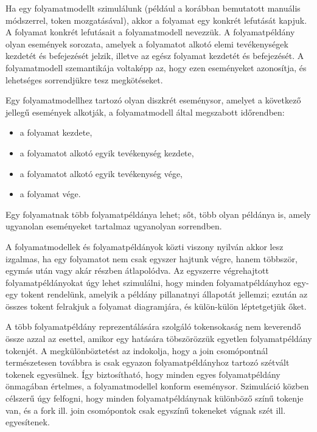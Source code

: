 
Ha egy folyamatmodellt szimulálunk (például a korábban bemutatott manuális módszerrel, token mozgatásával), akkor a folyamat egy konkrét lefutását kapjuk. A folyamat konkrét lefutásait a folyamatmodell  nevezzük. A folyamatpéldány olyan események sorozata, amelyek a folyamatot alkotó elemi tevékenységek kezdetét és befejezését jelzik, illetve az egész folyamat kezdetét és befejezését. A folyamatmodell szemantikája voltaképp az, hogy ezen eseményeket azonosítja, és lehetséges sorrendjükre tesz megkötéseket.

\begin{definicio}
	Egy folyamatmodellhez tartozó  olyan diszkrét eseménysor, amelyet a következő jellegű események alkotják, a folyamatmodell által megszabott időrendben: 	\begin{itemize}
	  \item a folyamat kezdete,
	  \item a folyamatot alkotó egyik tevékenység kezdete, 
	  \item a folyamatot alkotó egyik tevékenység vége, 
	  \item a folyamat vége.
	\end{itemize}
\end{definicio}

\begin{megjegyzes}
Egy folyamatnak több folyamatpéldánya lehet; sőt, több olyan példánya is, amely ugyanolan eseményeket tartalmaz ugyanolyan sorrendben.
\end{megjegyzes}

A folyamatmodellek és folyamatpéldányok közti viszony nyilván akkor lesz izgalmas, ha egy folyamatot nem csak egyszer hajtunk végre, hanem többször, egymás után vagy akár részben átlapolódva. Az egyszerre végrehajtott folyamatpéldányokat úgy lehet szimulálni, hogy minden folyamatpéldányhoz egy-egy tokent rendelünk, amelyik a példány pillanatnyi állapotát jellemzi; ezután az összes tokent felrakjuk a folyamat diagramjára, és külön-külön léptetgetjük őket. 

\begin{megjegyzes}
A több folyamatpéldány reprezentálására szolgáló tokensokaság nem keverendő össze azzal az esettel, amikor egy  hatására töbszörözzük egyetlen folyamatpéldány tokenjét.  A megkülönböztetést az indokolja, hogy a join csomópontnál természetesen továbbra is csak egyazon folyamatpéldányhoz tartozó szétvált tokenek egyesülnek. Így biztosítható, hogy minden egyes folyamatpéldány önmagában értelmes, a folyamatmodellel konform eseménysor. Szimuláció közben célszerű úgy felfogni, hogy minden folyamatpéldánynak különböző színű tokenje van, és a fork ill. join csomópontok csak egyszínű tokeneket vágnak szét ill. egyesítenek. 
\end{megjegyzes}

